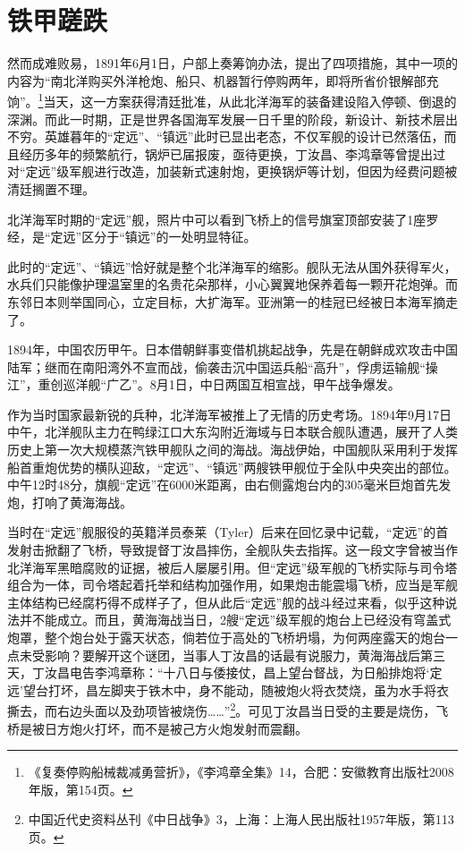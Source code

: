 \documentclass[12pt,UTF8]{ctexbook}
\begin{document}
\section{铁甲蹉跌}

然而成难败易，1891年6月1日，户部上奏筹饷办法，提出了四项措施，其中一项的内容为“南北洋购买外洋枪炮、船只、机器暂行停购两年，即将所省价银解部充饷”。\footnote{《复奏停购船械裁减勇营折》，《李鸿章全集》14，合肥：安徽教育出版社2008年版，第154页。}当天，这一方案获得清廷批准，从此北洋海军的装备建设陷入停顿、倒退的深渊。而此一时期，正是世界各国海军发展一日千里的阶段，新设计、新技术层出不穷。英雄暮年的“定远”、“镇远”此时已显出老态，不仅军舰的设计已然落伍，而且经历多年的频繁航行，锅炉已届报废，亟待更换，丁汝昌、李鸿章等曾提出过对“定远”级军舰进行改造，加装新式速射炮，更换锅炉等计划，但因为经费问题被清廷搁置不理。

北洋海军时期的“定远”舰，照片中可以看到飞桥上的信号旗室顶部安装了1座罗经，是“定远”区分于“镇远”的一处明显特征。

此时的“定远”、“镇远”恰好就是整个北洋海军的缩影。舰队无法从国外获得军火，水兵们只能像护理温室里的名贵花朵那样，小心翼翼地保养着每一颗开花炮弹。而东邻日本则举国同心，立定目标，大扩海军。亚洲第一的桂冠已经被日本海军摘走了。

1894年，中国农历甲午。日本借朝鲜事变借机挑起战争，先是在朝鲜成欢攻击中国陆军；继而在南阳湾外不宣而战，偷袭击沉中国运兵船“高升”，俘虏运输舰“操江”，重创巡洋舰“广乙”。8月1日，中日两国互相宣战，甲午战争爆发。

作为当时国家最新锐的兵种，北洋海军被推上了无情的历史考场。1894年9月17日中午，北洋舰队主力在鸭绿江口大东沟附近海域与日本联合舰队遭遇，展开了人类历史上第一次大规模蒸汽铁甲舰队之间的海战。海战伊始，中国舰队采用利于发挥船首重炮优势的横队迎敌，“定远”、“镇远”两艘铁甲舰位于全队中央突出的部位。中午12时48分，旗舰“定远”在6000米距离，由右侧露炮台内的305毫米巨炮首先发炮，打响了黄海海战。

当时在“定远”舰服役的英籍洋员泰莱（Tyler）后来在回忆录中记载，“定远”的首发射击掀翻了飞桥，导致提督丁汝昌摔伤，全舰队失去指挥。这一段文字曾被当作北洋海军黑暗腐败的证据，被后人屡屡引用。但“定远”级军舰的飞桥实际与司令塔组合为一体，司令塔起着托举和结构加强作用，如果炮击能震塌飞桥，应当是军舰主体结构已经腐朽得不成样子了，但从此后“定远”舰的战斗经过来看，似乎这种说法并不能成立。而且，黄海海战当日，2艘“定远”级军舰的炮台上已经没有穹盖式炮罩，整个炮台处于露天状态，倘若位于高处的飞桥坍塌，为何两座露天的炮台一点未受影响？要解开这个谜团，当事人丁汝昌的话最有说服力，黄海海战后第三天，丁汝昌电告李鸿章称：“十八日与倭接仗，昌上望台督战，为日船排炮将‘定远’望台打坏，昌左脚夹于铁木中，身不能动，随被炮火将衣焚烧，虽为水手将衣撕去，而右边头面以及劲项皆被烧伤……”\footnote{中国近代史资料丛刊《中日战争》3，上海：上海人民出版社1957年版，第113页。}。可见丁汝昌当日受的主要是烧伤，飞桥是被日方炮火打坏，而不是被己方火炮发射而震翻。
\end{document}
